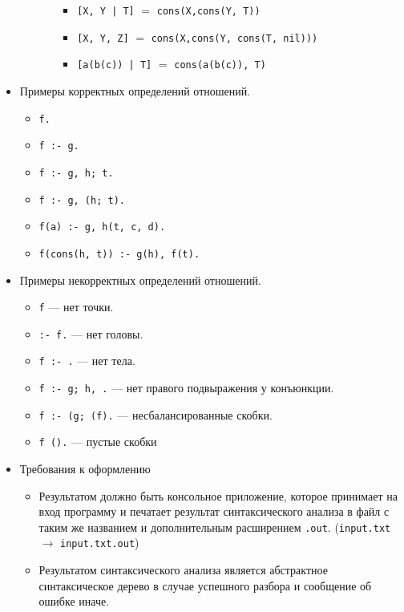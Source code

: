 \documentclass[12pt]{article}
\begin{document}
\begin{itemize}
\begin{itemize}
\begin{itemize}
          \begin{itemize}
            \item \verb![X, Y | T]! $=$ \verb!cons(X,cons(Y, T))!
            \item \verb![X, Y, Z]! $=$  \verb!cons(X,cons(Y, cons(T, nil)))!
            \item \verb![a(b(c)) | T]! $=$ \verb!cons(a(b(c)), T)!
          \end{itemize}
        \end{itemize}
      \end{itemize}
      \item Примеры корректных определений отношений.
      \begin{itemize}
        \item \verb!f.!
        \item \verb!f :- g.!
        \item \verb!f :- g, h; t.!
        \item \verb!f :- g, (h; t).!
        \item \verb!f(a) :- g, h(t, c, d).!
        \item \verb!f(cons(h, t)) :- g(h), f(t).!
      \end{itemize}
      \item Примеры некорректных определений отношений.
      \begin{itemize}
        \item \verb!f! --- нет точки.
        \item \verb!:- f.! --- нет головы.
        \item \verb!f :- .! --- нет тела.
        \item \verb!f :- g; h, .! --- нет правого подвыражения у конъюнкции.
        \item \verb!f :- (g; (f).! --- несбалансированные скобки.
        \item \verb!f ().! --- пустые скобки
      \end{itemize}
      \item Требования к оформлению
      \begin{itemize}
        \item Результатом должно быть консольное приложение, которое принимает на вход программу и печатает результат синтаксического анализа в файл с таким же названием и дополнительным расширением \verb!.out!. (\verb!input.txt! $\to$ \verb!input.txt.out!)
        \item Результатом синтаксического анализа является абстрактное синтаксическое дерево в случае успешного разбора и сообщение об ошибке иначе.

\end{itemize}
\end{itemize}
\end{document}
